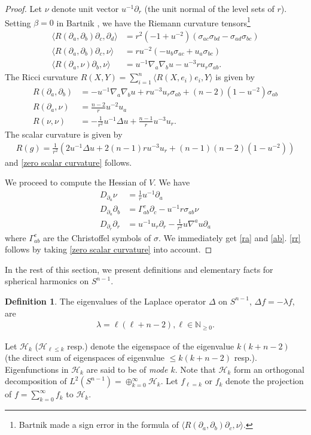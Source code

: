 \documentclass[12pt,twoside]{article}
\theoremstyle{plain}
\theoremstyle{definition}
\newtheorem{defn}[theorem]{Definition}
\theoremstyle{remark}
\newcommand{\pl}{\partial}
\newcommand{\na}{\nabla}
\newcommand{\lt}{\left}
\newcommand{\rt}{\right}
\numberwithin{equation}{section}
\begin{document}
\begin{proof}
Let $\nu $ denote unit vector $u^{-1} \pl_r$ (the unit normal of the level sets of $r$). Setting $\beta=0$ in Bartnik \cite[(2.20)-(2.22)]{B}, we have the Riemann curvature tensors\footnote{Bartnik made a sign error in the formula of $\langle R(\pl_a,\pl_b)\pl_c, \nu \rangle$. }
\begin{align*}
\langle R(\pl_a,\pl_b)\pl_c, \pl_d \rangle &= r^2 (-1+ u^{-2}) \lt( \sigma_{ac}\sigma_{bd} - \sigma_{ad}\sigma_{bc} \rt) \\ 
\langle R(\pl_a,\pl_b)\pl_c, \nu \rangle &= ru^{-2} \lt( -u_b \sigma_{ac} + u_a \sigma_{bc} \rt) \\
\langle R(\pl_a,\nu)\pl_b,\nu \rangle &= u^{-1} \na_a\na_b u - u^{-3} r u_r \sigma_{ab}.
\end{align*}
The Ricci curvature $R(X,Y) = \sum_{i=1}^n \langle R(X,e_i)e_i, Y \rangle$ is given by
\begin{align*}
R(\pl_a,\pl_b) &= -u^{-1}\na_a\na_b u + r u^{-3}u_r \sigma_{ab} + (n-2)(1-u^{-2})\sigma_{ab}\\
R(\pl_a,\nu) &= \frac{n-2}{r}u^{-2} u_a\\
R(\nu,\nu) &= - \frac{1}{r^2} u^{-1} \Delta u +  \frac{n-1}{r} u^{-3}u_r.
\end{align*}
The scalar curvature is given by
\begin{align*}
R(g) = \frac{1}{r^2} \lt( 2 u^{-1} \Delta u + 2(n-1)r u^{-3} u_r + (n-1)(n-2)(1 - u^{-2}) \rt)
\end{align*}
and \eqref{zero scalar curvature} follows.

We proceed to compute the Hessian of $V$. We have
\begin{align*}
D_{\pl_a} \nu &= \frac{1}{r}u^{-1} \pl_a\\
D_{\pl_a} \pl_b &= \Gamma_{ab}^c \pl_c - u^{-1}r \sigma_{ab} \nu\\
D_{\pl_r} \pl_r &= u^{-1}u_r \pl_r - \frac{1}{r^2} u \na^a u \pl_a
\end{align*}
where $\Gamma_{ab}^c$ are the Christoffel symbols of $\sigma$. We immediately get \eqref{ra} and \eqref{ab}. \eqref{rr} follows by taking \eqref{zero scalar curvature} into account.
\end{proof}

In the rest of this section, we present definitions and elementary facts for spherical harmonics on $S^{n-1}$.
\begin{defn}\label{spherical harmonics}
The eigenvalues of the Laplace operator $\Delta$ on $S^{n-1}$, $\Delta f = - \lambda f$, are
\begin{align*}
\lambda = \ell (\ell + n -2), \ell \in \mathbb{N}_{\ge 0}.
\end{align*}

Let $\mathcal{H}_{k}$ ($\mathcal{H}_{\ell \le k}$ resp.) denote the eigenspace of the eigenvalue $k(k+n-2)$ (the direct sum of eigenspaces of eigenvalue $\le k(k+n-2)$ resp.).  Eigenfunctions in $\mathcal{H}_{k}$ are said to be of {\it mode $k$}. Note that $\mathcal{H}_k$ form an orthogonal decomposition of $L^2(S^{n-1}) = \oplus_{k=0}^\infty \mathcal{H}_k$. Let $f_{\ell = k}$ or $f_k$ denote the projection of $f = \sum_{k=0}^\infty f_k$ to $\mathcal{H}_k$.
\end{defn}
\end{document}
